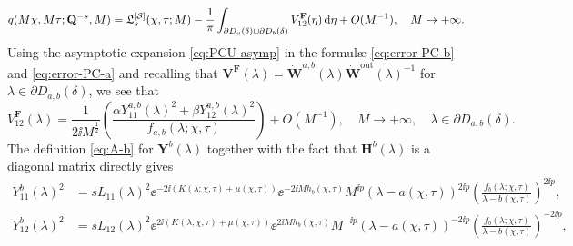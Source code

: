 \begin{equation}
q(M\chi, M\tau; \mathbf{Q}^{-s},M)=\mathfrak{L}_s^{[\mathcal{S}]}(\chi,\tau;M) - \frac{1}{\pi}\int_{\partial D_{a}(\delta) \cup \partial D_{b}(\delta)} V^{\mathbf{F}}_{12}(\eta)\,\mathrm{d} \eta 
 + O(M^{-1}), \quad M\to+\infty.
\label{eq:psi-k-V-12-bun}
\end{equation}
Using the asymptotic expansion \eqref{eq:PCU-asymp} in the formul\ae{} \eqref{eq:error-PC-b} and \eqref{eq:error-PC-a} and recalling that $\mathbf{V}^{\mathbf{F}}(\lambda) = \dot{\mathbf{W}}^{a,b}(\lambda)\dot{\mathbf{W}}^{\mathrm{out}}(\lambda)^{-1}$ for $\lambda\in \partial D_{a,b}(\delta)$, we see that
\begin{equation}
V^{\mathbf{F}}_{12}(\lambda) = \frac{1}{2\ii M^{\frac{1}{2}}} 
\left( 
\frac{\alpha Y_{11}^{a,b}(\lambda)^2 + \beta Y_{12}^{a,b}(\lambda)^2}{f_{a,b}(\lambda;\chi,\tau)}  
\right)
+ O(M^{-1}),\quad M\to+\infty, \quad \lambda\in\partial D_{a,b}(\delta).
\label{eq:VF-12-bun}
\end{equation}
The definition \eqref{eq:A-b} for $\mathbf{Y}^b(\lambda)$ together with the fact that $\mathbf{H}^b(\lambda)$ is a diagonal matrix directly gives
\begin{align}
Y^b_{11}(\lambda)^2 &= s L_{11}(\lambda)^2 \ee^{-2 \ii (K(\lambda;\chi,\tau) + \mu(\chi,\tau) )} \ee^{-2\ii M {h}_b(\chi,\tau)} M^{\ii p} (\lambda-a(\chi,\tau))^{2\ii p} \left( \frac{f_b(\lambda;\chi,\tau)}{\lambda-b(\chi,\tau)} \right)^{2\ii p},
\label{eq:A-b-11}\\
Y^b_{12}(\lambda)^2 &= s L_{12}(\lambda)^2 \ee^{2 \ii( K(\lambda;\chi,\tau) +\mu(\chi,\tau) )} \ee^{2\ii M {h}_b(\chi,\tau)} M^{-\ii p}(\lambda-a(\chi,\tau))^{-2\ii p} \left( \frac{f_b(\lambda;\chi,\tau)}{\lambda-b(\chi,\tau)} \right)^{-2\ii p},
\label{eq:A-b-12}
\end{align}
